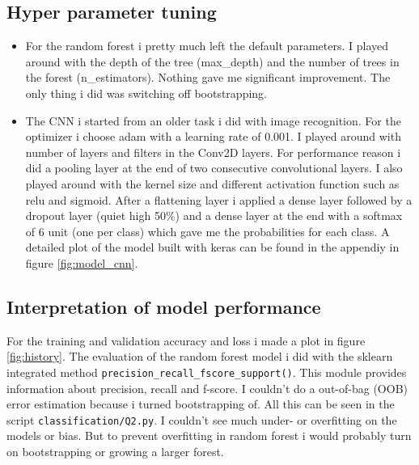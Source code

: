 \documentclass[]{article}
\begin{document}
	\subsection{Hyper parameter tuning}
	\begin{itemize}
		\item For the random forest i pretty much left the default parameters. I played around with the depth of the tree (max\_depth) and the number of trees in the forest (n\_estimators). Nothing gave me significant improvement. The only thing i did was switching off bootstrapping.
		\item The CNN i started from an older task i did with image recognition. For the optimizer i choose adam with a learning rate of 0.001. I played around with number of layers and filters in the Conv2D layers. For performance reason i did a pooling layer at the end of two consecutive convolutional layers. I also played around with the kernel size and different activation function such as relu and sigmoid. After a flattening layer i applied a dense layer followed by a dropout layer (quiet high 50\%) and a dense layer at the end with a softmax of 6 unit (one per class) which gave me the probabilities for each class. A detailed plot of the model built with keras can be found in the appendiy in figure \ref{fig:model_cnn}. 
	\end{itemize}
	
	\subsection{Interpretation of model performance}
	For the training and validation accuracy and loss i made a plot in figure \ref{fig:history}. The evaluation of the random forest model i did with the sklearn integrated method \texttt{precision\_recall\_fscore\_support()}. This module provides information about precision, recall and f-score. I couldn't do a out-of-bag (OOB) error estimation because i turned bootstrapping of. All this can be seen in the script \texttt{classification/Q2.py}. I couldn't see much under- or overfitting on the models or bias. But to prevent overfitting in random forest i would probably turn on bootstrapping or growing a larger forest.
	
\end{document}
